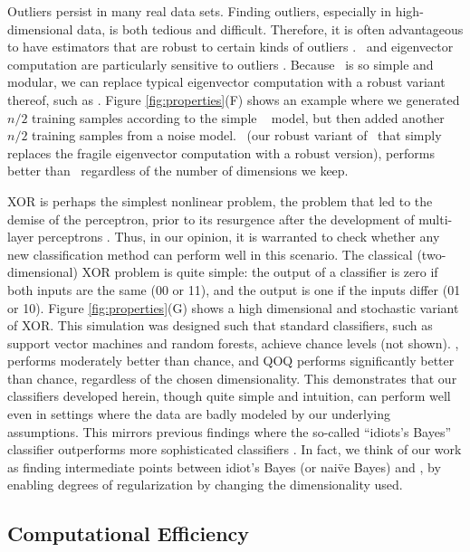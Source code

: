 \documentclass[10pt]{article}
\begin{document}
  Outliers persist in many real data sets.  Finding outliers, especially in high-dimensional data, is both tedious and difficult.  Therefore, it is often advantageous to have estimators that are robust to certain kinds of outliers \cite{Huber1981a,Rousseeuw1999a,Ferrari2010a}.  \Pca~and eigenvector computation are particularly sensitive to outliers \cite{Candes2009b}.  Because \Lol~is so simple and modular, we can replace typical eigenvector computation with a robust variant thereof, such as \cite{Zhang2014a}.  Figure \ref{fig:properties}(F) shows an example where we generated  $n/2$ training samples according to the simple \Lda~ model, but then added another $n/2$ training samples from a noise model.  \Lrl~(our robust variant of \Lol~that simply replaces the fragile eigenvector computation with a robust version), performs better than \Lol~regardless of the number of dimensions we keep.

  XOR is perhaps the simplest nonlinear problem, the problem that led to the demise of the perceptron, prior to its resurgence after the development of multi-layer perceptrons \cite{Bishop2006a}.  Thus, in our opinion, it is warranted to check whether any new classification method can perform well in this scenario.  The classical (two-dimensional) XOR problem is quite simple: the output of a classifier is zero if both inputs are the same (00 or 11), and the output is one if the inputs differ (01 or 10).  Figure \ref{fig:properties}(G) shows a high dimensional and stochastic variant of XOR.  This simulation was designed such that standard classifiers, such as support vector machines and random forests, achieve chance levels (not shown).  \Lol, performs moderately better than chance, and QOQ performs significantly better than chance, regardless of the chosen dimensionality.  This demonstrates that our classifiers developed herein, though quite simple and intuition, can perform well even in settings where the data are badly modeled by our underlying assumptions.  This mirrors previous findings where the so-called ``idiots's Bayes'' classifier outperforms more sophisticated classifiers \cite{Bickel2004a}.  In fact, we think of our work as finding intermediate points between idiot's Bayes (or nai\"ve Bayes) and \Fld, by enabling degrees of regularization by changing the dimensionality used.


\subsection*{Computational Efficiency}
\end{document}
